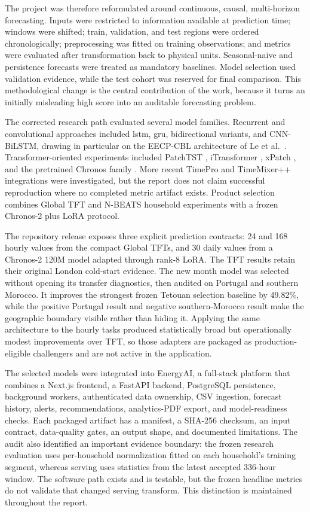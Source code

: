 The project was therefore reformulated around continuous, causal, multi-horizon forecasting. Inputs were restricted to information available at prediction time; windows were shifted; train, validation, and test regions were ordered chronologically; preprocessing was fitted on training observations; and metrics were evaluated after transformation back to physical units. Seasonal-naive and persistence forecasts were treated as mandatory baselines. Model selection used validation evidence, while the test cohort was reserved for final comparison. This methodological change is the central contribution of the work, because it turns an initially misleading high score into an auditable forecasting problem.

The corrected research path evaluated several model families. Recurrent and convolutional approaches included \ac{lstm}, \ac{gru}, bidirectional variants, and CNN-BiLSTM, drawing in particular on the EECP-CBL architecture of Le et al.\ \cite{le2019eecpcbl}. Transformer-oriented experiments included PatchTST \cite{nie2023patchtst}, iTransformer \cite{liu2024itransformer}, xPatch \cite{stitsyuk2025xpatch}, and the pretrained Chronos family \cite{ansari2024chronos,chronos2repo}. More recent TimePro and TimeMixer++ integrations were investigated, but the report does not claim successful reproduction where no completed metric artifact exists. Product selection combines Global TFT and N-BEATS household experiments with a frozen Chronos-2 plus LoRA protocol.

The repository release exposes three explicit prediction contracts: 24 and 168 hourly values from the compact Global TFTs, and 30 daily values from a Chronos-2 120M model adapted through rank-8 LoRA. The TFT results retain their original London cold-start evidence. The new month model was selected without opening its transfer diagnostics, then audited on Portugal and southern Morocco. It improves the strongest frozen Tetouan selection baseline by 49.82\%, while the positive Portugal result and negative southern-Morocco result make the geographic boundary visible rather than hiding it. Applying the same architecture to the hourly tasks produced statistically broad but operationally modest improvements over TFT, so those adapters are packaged as production-eligible challengers and are not active in the application.

The selected models were integrated into EnergyAI, a full-stack platform that combines a Next.js frontend, a FastAPI backend, PostgreSQL persistence, background workers, authenticated data ownership, CSV ingestion, forecast history, alerts, recommendations, analytics-PDF export, and model-readiness checks. Each packaged artifact has a manifest, a SHA-256 checksum, an input contract, data-quality gates, an output shape, and documented limitations. The audit also identified an important evidence boundary: the frozen research evaluation uses per-household normalization fitted on each household's training segment, whereas serving uses statistics from the latest accepted 336-hour window. The software path exists and is testable, but the frozen headline metrics do not validate that changed serving transform. This distinction is maintained throughout the report.

